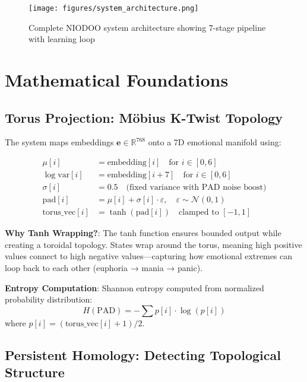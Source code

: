 \documentclass[11pt,a4paper]{article}
\begin{document}
\begin{figure}[H]
\centering
\texttt{[image: figures/system\_architecture.png]}
\caption{Complete NIODOO system architecture showing 7-stage pipeline with learning loop}
\label{fig:architecture}
\end{figure}

\section{Mathematical Foundations}

\subsection{Torus Projection: Möbius K-Twist Topology}

The system maps embeddings $\mathbf{e} \in \mathbb{R}^{768}$ onto a 7D emotional manifold using:

\begin{align}
\mu[i] &= \text{embedding}[i] \quad \text{for } i \in [0, 6] \\
\log\text{var}[i] &= \text{embedding}[i+7] \quad \text{for } i \in [0, 6] \\
\sigma[i] &= 0.5 \quad \text{(fixed variance with PAD noise boost)} \\
\text{pad}[i] &= \mu[i] + \sigma[i] \cdot \varepsilon, \quad \varepsilon \sim \mathcal{N}(0,1) \\
\text{torus\_vec}[i] &= \tanh(\text{pad}[i]) \quad \text{clamped to } [-1, 1]
\end{align}

\textbf{Why Tanh Wrapping?}: The tanh function ensures bounded output while creating a toroidal topology. States wrap around the torus, meaning high positive values connect to high negative values—capturing how emotional extremes can loop back to each other (euphoria → mania → panic).

\textbf{Entropy Computation}: Shannon entropy computed from normalized probability distribution:
\begin{equation}
H(\text{PAD}) = -\sum p[i] \cdot \log(p[i])
\end{equation}
where $p[i] = (\text{torus\_vec}[i] + 1) / 2$.

\subsection{Persistent Homology: Detecting Topological Structure}
\end{document}
